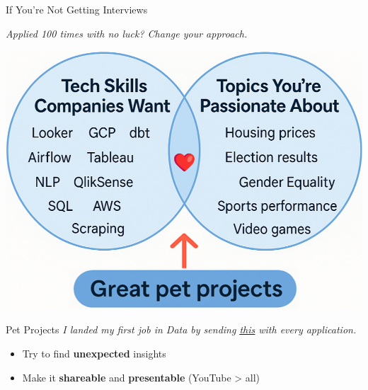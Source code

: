 \documentclass[10pt,a4paper]{article}
\begin{document}
\begin{multicols}{3}
\begin{textbox}{If You're Not Getting Interviews}
\begin{itemize}
	\end{itemize}
\emph{Applied 100 times with no luck? Change your approach.}
\end{textbox}

\begin{textboxWhite}{}
\includegraphics[width=\textwidth]{image.png}
\end{textboxWhite}

	
\begin{textboxRed}{Pet Projects}
\emph{I landed my first job in Data by sending \underline{\href{https://www.youtube.com/watch?v=54jvW1ulaP0&t=961s}{this}} with every application.}

\begin{itemize}
    \item Try to find \textbf{unexpected} insights
    \item Make it \textbf{shareable} and \textbf{presentable} (YouTube > all)
\end{itemize}


\end{textboxRed}
\end{multicols}
\end{document}
